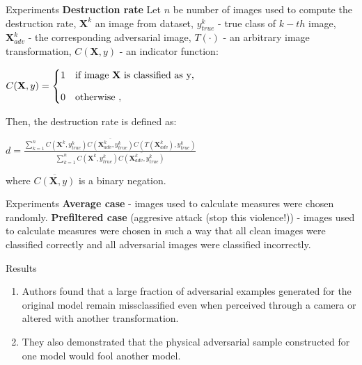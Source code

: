 \documentclass[15pt]{beamer}
\begin{document}
\begin{frame}{Experiments}
  \textbf{Destruction rate}
  \vskip0.1in
  Let $n$ be number of images used to compute the destruction rate, $\textbf{X}^k$ an image from dataset, $y^k_{true}$ - true class of $k-th$ image, $\textbf{X}^k_{adv}$ - the corresponding adversarial image, $T(\cdot)$ - an arbitrary image transformation, $C(\textbf{X}, y)$ - an indicator function:

  \begin{center}
  $C(\textbf{X}, y) = \begin{cases} \displaystyle {1} & \mbox{if image \textbf{X} is classified as y}, \\[2ex] \displaystyle {0}& \mbox{otherwise } , \end{cases}$
  \end{center}

  Then, the destruction rate is defined as:

  \begin{center}
  $d = \frac{\sum^n_{k=1}C(\textbf{X}^k, y^k_{true})\overline{C(\textbf{X}^k_{adv}, y^k_{true})}C(T(\textbf{X}^k_{adv}),  y^k_{true})}{\sum^n_{k=1}C(\textbf{X}^k, y^k_{true})\overline{C(\textbf{X}^k_{adv}, y^k_{true})}}$
  \end{center}

  where $\overline{C(\textbf{X}, y)}$ is a binary negation.
\end{frame}


\begin{frame}{Experiments}
\textbf{Average case} - images used to calculate measures were chosen randomly.
\vskip0.1in
\textbf{Prefiltered case} (aggresive attack (stop this violence!)) - images used to calculate measures were chosen in such a way that all clean images were classified correctly and all adversarial images were classified incorrectly.
\end{frame}


\begin{frame}{Results}
  \begin{enumerate}
  \item Authors found that a large fraction of adversarial examples generated for the original model remain missclassified even when perceived through a camera or altered with another transformation.
  \item They also demonstrated that the physical adversarial sample constructed for one model would fool another model.
  \end{enumerate}
\end{frame}
\end{document}
